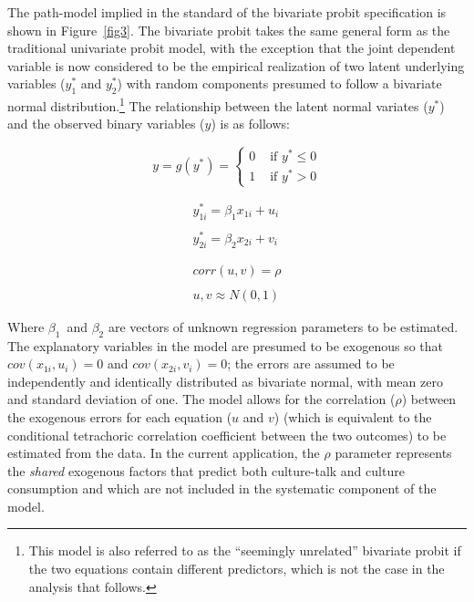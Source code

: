 \documentclass[11pt]{article}
\begin{document}
The path-model implied in the standard of the bivariate probit specification is shown in Figure~\ref{fig3}. The bivariate probit takes the same general form as the traditional univariate probit model, with the exception that the joint dependent variable is now considered to be the empirical realization of two latent underlying variables ($y^{*}_{1}$ and $y^{*}_{2}$) with random components presumed to follow a bivariate normal distribution.\footnote{This model is also referred to as the ``seemingly unrelated'' bivariate probit if the two equations contain different predictors, which is not the case in the analysis that follows.} The relationship between the latent normal variates ($y^{*}$) and the observed binary variables ($y$) is as follows:

\begin{equation}
y=g(y^{*})=\left\{
        \begin{array}{rl}
                0 &\mbox{ if $y^{*} \leq 0$} \\
                1 &\mbox{ if $y^{*} > 0$}  
        \end{array} \right.
        \label{eq1}
\end{equation}

\begin{equation}
        \begin{array}{rl}
                y^{*}_{1i}=\beta_{1} x_{1i}+u_{i} \\  \\
                y^{*}_{2i}=\beta_{2} x_{2i}+v_{i} \\  \\ \\
                corr(u,v)=\rho \\ \\
                u,v \approx N(0,1)  
        \end{array}
        \label{eq2}
\end{equation}

Where $\beta_{1}$\ and $\beta_{2}$ are vectors of unknown regression parameters to be estimated.  The explanatory variables in the model are presumed to be exogenous so that $cov(x_{1i},u_{i})=0$ and $cov(x_{2i},v_{i})=0$;  the errors are assumed to be independently and identically distributed as bivariate normal, with mean zero and standard deviation of one. The model allows for the correlation ($\rho$) between the exogenous errors for each equation ($u$ and $v$) (which is equivalent to the conditional tetrachoric correlation coefficient between the two outcomes) to be estimated from the data. In the current application, the $\rho$ parameter represents the \emph{shared} exogenous factors that predict both culture-talk and culture consumption and which are not included in the systematic component of the model. 
\end{document}
